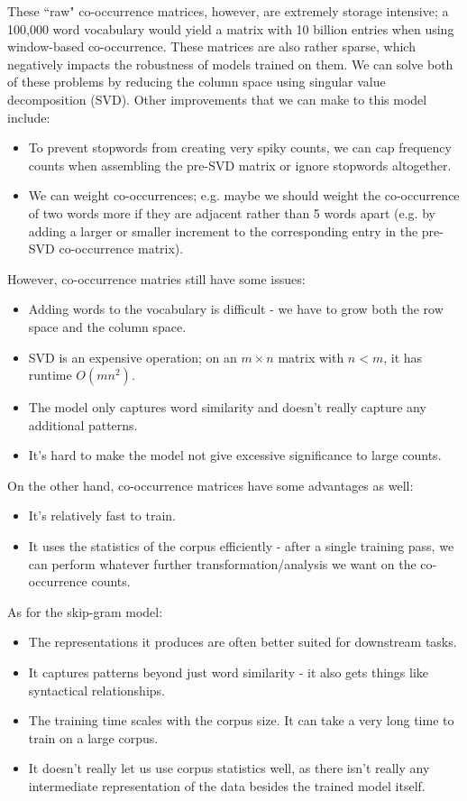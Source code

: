 These ``raw" co-occurrence matrices, however, are extremely storage intensive; a 100,000 word vocabulary would yield a matrix with 10 billion entries when using window-based co-occurrence. These matrices are also rather sparse, which negatively impacts the robustness of models trained on them. We can solve both of these problems by reducing the column space using singular value decomposition (SVD). Other improvements that we can make to this model include:
\begin{itemize}
\item To prevent stopwords from creating very spiky counts, we can cap frequency counts when assembling the pre-SVD matrix or ignore stopwords altogether.
\item We can weight co-occurrences; e.g. maybe we should weight the co-occurrence of two words more if they are adjacent rather than 5 words apart (e.g. by adding a larger or smaller increment to the corresponding entry in the pre-SVD co-occurrence matrix).
\end{itemize}
However, co-occurrence matries still have some issues:
\begin{itemize}
\item Adding words to the vocabulary is difficult - we have to grow both the row space and the column space.
\item SVD is an expensive operation; on an $m\times n$ matrix with $n < m$, it has runtime $O(mn^2)$.
\item The model only captures word similarity and doesn't really capture any additional patterns.
\item It's hard to make the model not give excessive significance to large counts.
\end{itemize}
On the other hand, co-occurrence matrices have some advantages as well:
\begin{itemize}
\item It's relatively fast to train.
\item It uses the statistics of the corpus efficiently - after a single training pass, we can perform whatever further transformation/analysis we want on the co-occurrence counts.
\end{itemize}

As for the skip-gram model:
\begin{itemize}
\item The representations it produces are often better suited for downstream tasks.
\item It captures patterns beyond just word similarity - it also gets things like syntactical relationships.
\item The training time scales with the corpus size. It can take a very long time to train on a large corpus.
\item It doesn't really let us use corpus statistics well, as there isn't really any intermediate representation of the data besides the trained model itself.
\end{itemize}

